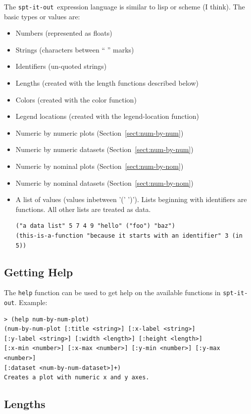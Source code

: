\documentclass{article}
\newcommand{\sio}{{\tt spt-it-out}}
\begin{document}
The \sio\ expression language is similar to lisp or scheme (I think).
The basic types or values are:
\begin{itemize}
\item Numbers (represented as floats)
\item Strings (characters between `` '' marks)
\item Identifiers (un-quoted strings)
\item Lengths (created with the length functions described below)
\item Colors (created with the color function)
\item Legend locations (created with the legend-location function)
\item Numeric by numeric plots (Section~\ref{sect:num-by-num})
\item Numeric by numeric datasets (Section~\ref{sect:num-by-num})
\item Numeric by nominal plots (Section~\ref{sect:num-by-nom})
\item Numeric by nominal datasets (Section~\ref{sect:num-by-nom})
\item A list of values (values inbetween '(' ')').  Lists beginning
  with identifiers are functions.  All other lists are treated as
  data.
\begin{verbatim}
("a data list" 5 7 4 9 "hello" ("foo") "baz")
(this-is-a-function "because it starts with an identifier" 3 (in 5))
\end{verbatim}
\end{itemize}

\subsection{Getting Help}

The {\tt help} function can be used to get help on the available
functions in \sio.  Example:
\begin{verbatim}
> (help num-by-num-plot)
(num-by-num-plot [:title <string>] [:x-label <string>]
[:y-label <string>] [:width <length>] [:height <length>]
[:x-min <number>] [:x-max <number>] [:y-min <number>] [:y-max <number>]
[:dataset <num-by-num-dataset>]+)
Creates a plot with numeric x and y axes.
\end{verbatim}

\subsection{Lengths}
\end{document}
